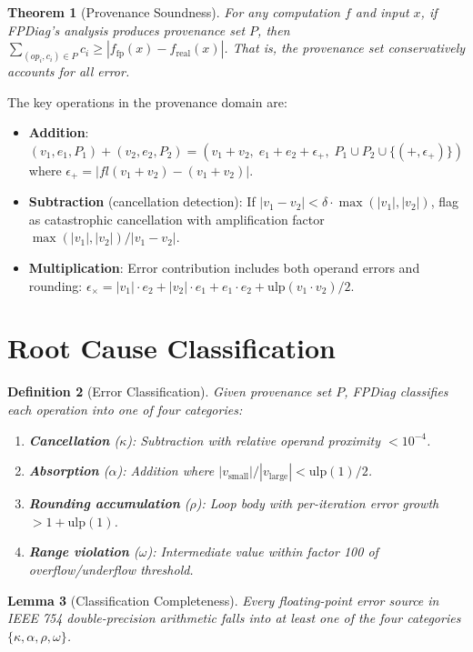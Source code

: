 \documentclass[11pt]{article}
\newtheorem{theorem}{Theorem}
\newtheorem{definition}[theorem]{Definition}
\newtheorem{lemma}[theorem]{Lemma}
\begin{document}
\begin{theorem}[Provenance Soundness]
\label{thm:provenance}
For any computation $f$ and input $x$, if FPDiag's analysis produces provenance set $P$, then $\sum_{(op_i, c_i) \in P} c_i \geq |f_{\text{fp}}(x) - f_{\text{real}}(x)|$. That is, the provenance set conservatively accounts for all error.
\end{theorem}

The key operations in the provenance domain are:
\begin{itemize}
\item \textbf{Addition}: $(v_1, e_1, P_1) + (v_2, e_2, P_2) = (v_1 + v_2, \; e_1 + e_2 + \epsilon_+, \; P_1 \cup P_2 \cup \{(+, \epsilon_+)\})$ where $\epsilon_+ = |fl(v_1 + v_2) - (v_1 + v_2)|$.
\item \textbf{Subtraction} (cancellation detection): If $|v_1 - v_2| < \delta \cdot \max(|v_1|, |v_2|)$, flag as catastrophic cancellation with amplification factor $\max(|v_1|, |v_2|) / |v_1 - v_2|$.
\item \textbf{Multiplication}: Error contribution includes both operand errors and rounding: $\epsilon_\times = |v_1| \cdot e_2 + |v_2| \cdot e_1 + e_1 \cdot e_2 + \text{ulp}(v_1 \cdot v_2)/2$.
\end{itemize}

\section{Root Cause Classification}
\label{sec:classify}

\begin{definition}[Error Classification]
Given provenance set $P$, FPDiag classifies each operation into one of four categories:
\begin{enumerate}
\item \textbf{Cancellation} ($\kappa$): Subtraction with relative operand proximity $< 10^{-4}$.
\item \textbf{Absorption} ($\alpha$): Addition where $|v_{\text{small}}| / |v_{\text{large}}| < \text{ulp}(1)/2$.
\item \textbf{Rounding accumulation} ($\rho$): Loop body with per-iteration error growth $> 1 + \text{ulp}(1)$.
\item \textbf{Range violation} ($\omega$): Intermediate value within factor 100 of overflow/underflow threshold.
\end{enumerate}
\end{definition}

\begin{lemma}[Classification Completeness]
\label{lem:complete}
Every floating-point error source in IEEE 754 double-precision arithmetic falls into at least one of the four categories $\{\kappa, \alpha, \rho, \omega\}$.
\end{lemma}
\end{document}
